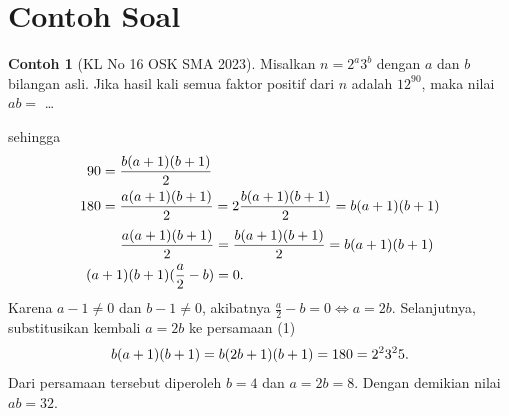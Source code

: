 \documentclass[aspectratio=169]{beamer}
\theoremstyle{definition}
\newtheorem{contoh}{Contoh}
\begin{document}
\section*{Contoh Soal}
\begin{frame}{\insertsection}
  \begin{contoh}[KL No 16 OSK SMA 2023]
    Misalkan $n=2^a3^b$ dengan $a$ dan $b$ bilangan asli. Jika hasil kali semua faktor positif dari $n$ adalah $12^{90}$, maka nilai $ab=$ \ldots
  \end{contoh}
\end{frame}
\begin{frame}{\insertsection}{\insertsubsection}
  sehingga
  \begin{align}
    90  & = \frac{b(a+1)(b+1)}{2} \notag                              \\
    180 & = \frac{a(a+1)(b+1)}{2}=2 \frac{b(a+1)(b+1)}{2}=b(a+1)(b+1)
  \end{align}
  \begin{align}
    \frac{a(a+1)(b+1)}{2}     & =\frac{b(a+1)(b+1)}{2}=b(a+1)(b+1) \notag \\
    (a+1)(b+1)(\frac{a}{2}-b) & =0.\notag
  \end{align}
  Karena $a-1 \neq 0$ dan $b-1 \neq 0$, akibatnya $\frac{a}{2}-b=0 \iff a=2b.$ Selanjutnya, substitusikan kembali $a=2b$ ke persamaan (1)
  \begin{align}
    b(a+1)(b+1)=b(2b+1)(b+1)=180=2^23^25. \notag
  \end{align}
  Dari persamaan tersebut diperoleh $b=4$ dan $a=2b=8.$ Dengan demikian nilai $ab=32.$
\end{frame}
\end{document}
